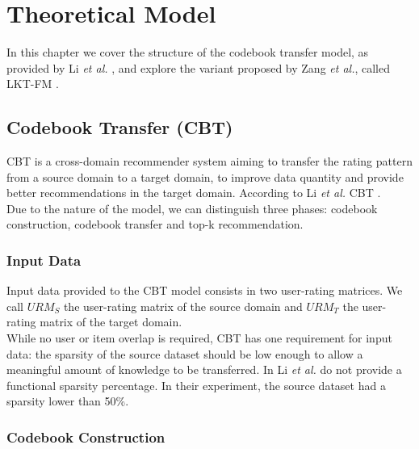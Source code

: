 \chapter{Theoretical Model}
\label{ch:theoretical-model}

In this chapter we cover the structure of the codebook transfer model, as provided by Li \textit{et al.} \cite{10.5555/1661445.1661773}, and explore the variant proposed by Zang \textit{et al.}, called LKT-FM \cite{10.1007/978-3-319-71246-8_39}.


\section{Codebook Transfer (CBT)}

CBT is a cross-domain recommender system aiming to transfer the rating pattern from a source domain to a target domain, to improve data quantity and provide better recommendations in the target domain. According to Li \textit{et al.} \cite{10.5555/1661445.1661773} CBT .\\
Due to the nature of the model, we can distinguish three phases: codebook construction, codebook transfer and top-k recommendation.


\subsection{Input Data}

Input data provided to the CBT model consists in two user-rating matrices. We call $URM_S$ the user-rating matrix of the source domain and $URM_T$ the user-rating matrix of the target domain.\\
While no user or item overlap is required, CBT has one requirement for input data: the sparsity of the source dataset should be low enough to allow a meaningful amount of knowledge to be transferred. In \cite{10.5555/1661445.1661773} Li \textit{et al.} do not provide a functional sparsity percentage. In their experiment, the source dataset had a sparsity lower than 50\%.


\subsection{Codebook Construction}

